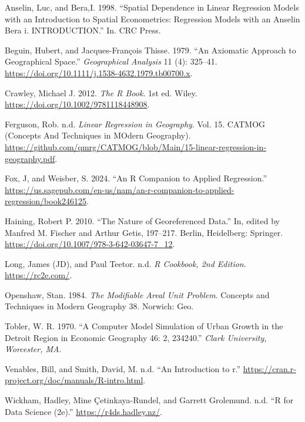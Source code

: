 \documentclass[
  letterpaper,
  DIV=11,
  numbers=noendperiod]{scrreprt}
\newlength{\cslhangindent}
\newenvironment{CSLReferences}[2] %
 {\begin{list}{}{%
  \setlength{\itemindent}{0pt}
  \setlength{\leftmargin}{0pt}
  \setlength{\parsep}{0pt}
  \ifodd #1
   \setlength{\leftmargin}{\cslhangindent}
   \setlength{\itemindent}{-1\cslhangindent}
  \fi
  \setlength{\itemsep}{#2\baselineskip}}}
 {\end{list}}
\begin{document}

\label{refs}
\begin{CSLReferences}{1}{0}
Anselin, Luc, and Bera,I. 1998. {``Spatial Dependence in Linear
Regression Models with an Introduction to Spatial Econometrics:
Regression Models with an Anselin Bera i. INTRODUCTION.''} In. CRC
Press.

Beguin, Hubert, and Jacques-François Thisse. 1979. {``An {Axiomatic}
{Approach} to {Geographical} {Space}.''} \emph{Geographical Analysis} 11
(4): 325--41. \url{https://doi.org/10.1111/j.1538-4632.1979.tb00700.x}.

Crawley, Michael J. 2012. \emph{The R Book}. 1st ed. Wiley.
\url{https://doi.org/10.1002/9781118448908}.

Ferguson, Rob. n.d. \emph{Linear Regression in Geography}. Vol. 15.
CATMOG (Concepts And Techniques in MOdern Geography).
\url{https://github.com/qmrg/CATMOG/blob/Main/15-linear-regression-in-geography.pdf}.

Fox, J, and Weisber, S. 2024. {``An R Companion to Applied
Regression.''}
\url{https://us.sagepub.com/en-us/nam/an-r-companion-to-applied-regression/book246125}.

Haining, Robert P. 2010. {``The Nature of Georeferenced Data.''} In,
edited by Manfred M. Fischer and Arthur Getis, 197--217. Berlin,
Heidelberg: Springer.
\url{https://doi.org/10.1007/978-3-642-03647-7_12}.

Long, James (JD), and Paul Teetor. n.d. \emph{R Cookbook, 2nd Edition}.
\url{https://rc2e.com/}.

Openshaw, Stan. 1984. \emph{The Modifiable Areal Unit Problem}. Concepts
and Techniques in Modern Geography 38. Norwich: Geo.

Tobler, W. R. 1970. {``A Computer Model Simulation of Urban Growth in
the Detroit Region in Economic Geography 46: 2, 234{\textendash}240.''}
\emph{Clark University, Worcester, MA}.

Venables, Bill, and Smith, David, M. n.d. {``An Introduction to r.''}
\url{https://cran.r-project.org/doc/manuals/R-intro.html}.

Wickham, Hadley, Mine Çetinkaya-Rundel, and Garrett Grolemund. n.d. {``R
for Data Science (2e).''} \url{https://r4ds.hadley.nz/}.

\end{CSLReferences}
\end{document}
